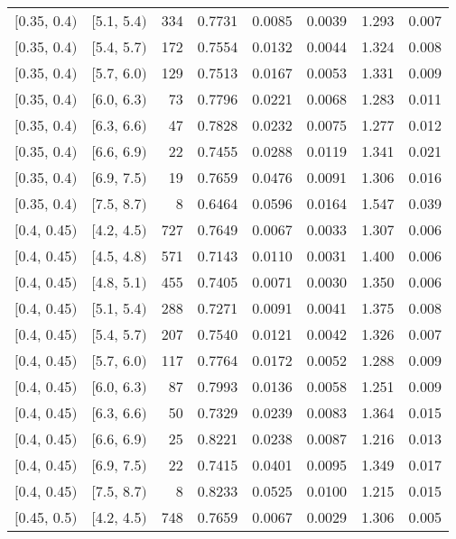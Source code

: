 \begin{longtable}{| l | l | r | r | r | r | r | r |}
        $[$0.35, 0.4$)$ & $[$5.1, 5.4$)$ & 334 & 0.7731 & 0.0085 & 0.0039 & 1.293 & 0.007 \\
        $[$0.35, 0.4$)$ & $[$5.4, 5.7$)$ & 172 & 0.7554 & 0.0132 & 0.0044 & 1.324 & 0.008 \\
        $[$0.35, 0.4$)$ & $[$5.7, 6.0$)$ & 129 & 0.7513 & 0.0167 & 0.0053 & 1.331 & 0.009 \\
        $[$0.35, 0.4$)$ & $[$6.0, 6.3$)$ & 73 & 0.7796 & 0.0221 & 0.0068 & 1.283 & 0.011 \\
        $[$0.35, 0.4$)$ & $[$6.3, 6.6$)$ & 47 & 0.7828 & 0.0232 & 0.0075 & 1.277 & 0.012 \\
        $[$0.35, 0.4$)$ & $[$6.6, 6.9$)$ & 22 & 0.7455 & 0.0288 & 0.0119 & 1.341 & 0.021 \\
        $[$0.35, 0.4$)$ & $[$6.9, 7.5$)$ & 19 & 0.7659 & 0.0476 & 0.0091 & 1.306 & 0.016 \\
        $[$0.35, 0.4$)$ & $[$7.5, 8.7$)$ & 8 & 0.6464 & 0.0596 & 0.0164 & 1.547 & 0.039 \\
        $[$0.4, 0.45$)$ & $[$4.2, 4.5$)$ & 727 & 0.7649 & 0.0067 & 0.0033 & 1.307 & 0.006 \\
        $[$0.4, 0.45$)$ & $[$4.5, 4.8$)$ & 571 & 0.7143 & 0.0110 & 0.0031 & 1.400 & 0.006 \\
        $[$0.4, 0.45$)$ & $[$4.8, 5.1$)$ & 455 & 0.7405 & 0.0071 & 0.0030 & 1.350 & 0.006 \\
        $[$0.4, 0.45$)$ & $[$5.1, 5.4$)$ & 288 & 0.7271 & 0.0091 & 0.0041 & 1.375 & 0.008 \\
        $[$0.4, 0.45$)$ & $[$5.4, 5.7$)$ & 207 & 0.7540 & 0.0121 & 0.0042 & 1.326 & 0.007 \\
        $[$0.4, 0.45$)$ & $[$5.7, 6.0$)$ & 117 & 0.7764 & 0.0172 & 0.0052 & 1.288 & 0.009 \\
        $[$0.4, 0.45$)$ & $[$6.0, 6.3$)$ & 87 & 0.7993 & 0.0136 & 0.0058 & 1.251 & 0.009 \\
        $[$0.4, 0.45$)$ & $[$6.3, 6.6$)$ & 50 & 0.7329 & 0.0239 & 0.0083 & 1.364 & 0.015 \\
        $[$0.4, 0.45$)$ & $[$6.6, 6.9$)$ & 25 & 0.8221 & 0.0238 & 0.0087 & 1.216 & 0.013 \\
        $[$0.4, 0.45$)$ & $[$6.9, 7.5$)$ & 22 & 0.7415 & 0.0401 & 0.0095 & 1.349 & 0.017 \\
        $[$0.4, 0.45$)$ & $[$7.5, 8.7$)$ & 8 & 0.8233 & 0.0525 & 0.0100 & 1.215 & 0.015 \\
        $[$0.45, 0.5$)$ & $[$4.2, 4.5$)$ & 748 & 0.7659 & 0.0067 & 0.0029 & 1.306 & 0.005 \\

\end{longtable}
